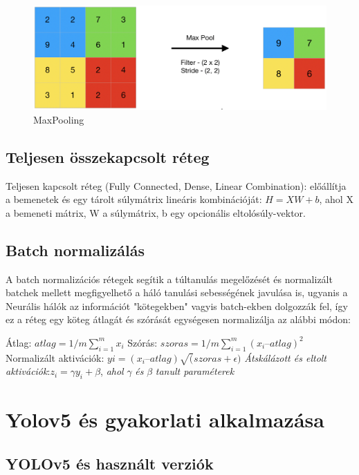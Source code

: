 \documentclass{article}
\begin{document}
\begin{figure}[h]
\centering
\includegraphics[width=0.75\linewidth]{Screenshot-2019-07-21-at-2.57.13-AM.png}
\caption{\label{fig:Pooling}MaxPooling}
\end{figure}

\subsection{Teljesen összekapcsolt réteg }

Teljesen kapcsolt réteg (Fully Connected, Dense, Linear Combination): előállítja a bemenetek és egy tárolt súlymátrix lineáris kombinációját: 
 $H=XW+b$, ahol X a bemeneti mátrix, W a súlymátrix, b egy opcionális eltolósúly-vektor.

\subsection{Batch normalizálás}

A batch normalizációs rétegek segítik a túltanulás megelőzését és normalizált batchek mellett megfigyelhető a háló tanulási sebességének javulása is, ugyanis a Neurális hálók az információt "kötegekben" vagyis batch-ekben dolgozzák fel, így ez a réteg egy köteg átlagát és szórását egységesen normalizálja az alábbi módon:

\noindent Átlag: $atlag = 1/m \displaystyle\sum_{i=1}^{m} x_i$  \newline
Szórás: $szoras = 1/m \displaystyle\sum_{i=1}^{m} (x_i – atlag)^2 $\newline
Normalizált aktivációk: $yi = (x_i – atlag) \sqrt(szoras + \epsilon)$ \newline
\newline
\textit{Átskálázott és eltolt aktivációk}:$ z_i = \gamma y_i + \beta $, 
\textit{ahol} $\gamma$ \textit{és} $\beta$  \textit{tanult paraméterek}
\newpage
\section{Yolov5 és gyakorlati alkalmazása}
\subsection{YOLOv5 és használt verziók}
\end{document}
